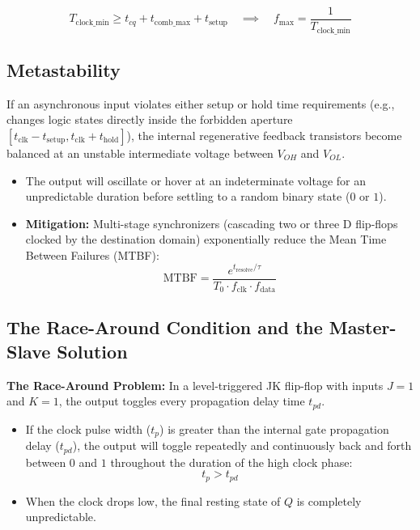 \begin{equation}
\label{eq:max_clock_freq}
T_{\text{clock\_min}} \ge t_{cq} + t_{\text{comb\_max}} + t_{\text{setup}} \quad \implies \quad f_{\text{max}} = \frac{1}{T_{\text{clock\_min}}}
\end{equation}

\subsection{Metastability}
If an asynchronous input violates either setup or hold time requirements (e.g., changes logic states directly inside the forbidden aperture $[t_{\text{clk}} - t_{\text{setup}}, t_{\text{clk}} + t_{\text{hold}}]$), the internal regenerative feedback transistors become balanced at an unstable intermediate voltage between $V_{OH}$ and $V_{OL}$.
\begin{itemize}
    \item The output will oscillate or hover at an indeterminate voltage for an unpredictable duration before settling to a random binary state ($0$ or $1$).
    \item \textbf{Mitigation:} Multi-stage synchronizers (cascading two or three D flip-flops clocked by the destination domain) exponentially reduce the Mean Time Between Failures (MTBF):
    \begin{equation}
    \label{eq:mtbf}
    \text{MTBF} = \frac{e^{t_{\text{resolve}} / \tau}}{T_0 \cdot f_{\text{clk}} \cdot f_{\text{data}}}
    \end{equation}
\end{itemize}

\subsection{The Race-Around Condition and the Master-Slave Solution}
\textbf{The Race-Around Problem:} In a level-triggered JK flip-flop with inputs $J = 1$ and $K = 1$, the output toggles every propagation delay time $t_{pd}$.
\begin{itemize}
    \item If the clock pulse width ($t_p$) is greater than the internal gate propagation delay ($t_{pd}$), the output will toggle repeatedly and continuously back and forth between $0$ and $1$ throughout the duration of the high clock phase:
    \begin{equation}
    \label{eq:race_around_condition}
    t_p > t_{pd}
    \end{equation}
    \item When the clock drops low, the final resting state of $Q$ is completely unpredictable.
\end{itemize}

